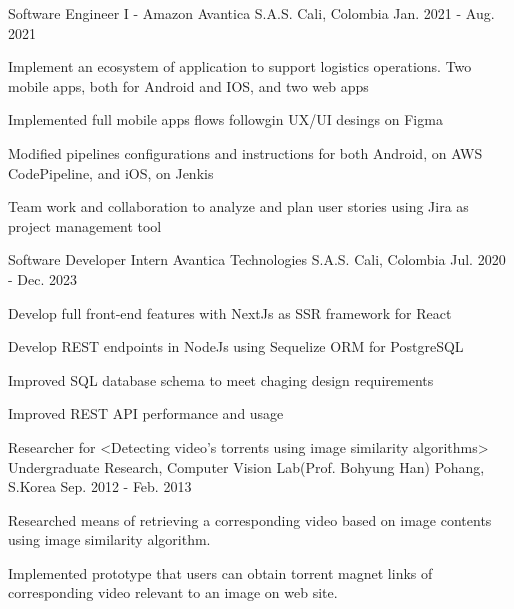 \begin{cventries}
  \cventry
  {Software Engineer I - Amazon} %
  {Avantica S.A.S.} %
  {Cali, Colombia} %
  {Jan. 2021 - Aug. 2021} %
  {
    \begin{cvitems} %
      \item {Implement an ecosystem of application to support logistics operations. Two mobile apps, both for Android and IOS, and two web apps}
      \item {Implemented full mobile apps flows followgin UX/UI desings on Figma}
      \item {Modified pipelines configurations and instructions for both Android, on AWS CodePipeline, and iOS, on Jenkis}
      \item {Team work and collaboration to analyze and plan user stories using Jira as project management tool}
    \end{cvitems}
  }

  \cventry
    {Software Developer Intern} %
    {Avantica Technologies S.A.S.} %
    {Cali, Colombia} %
    {Jul. 2020 - Dec. 2023} %
    {
      \begin{cvitems} %
        \item {Develop full front‐end features with NextJs as SSR framework for React}
        \item {Develop REST endpoints in NodeJs using Sequelize ORM for PostgreSQL}
        \item {Improved SQL database schema to meet chaging design requirements}
        \item {Improved REST API performance and usage}
      \end{cvitems}
    }

  \cventry
    {Researcher for <Detecting video’s torrents using image similarity algorithms>} %
    {Undergraduate Research, Computer Vision Lab(Prof. Bohyung Han)} %
    {Pohang, S.Korea} %
    {Sep. 2012 - Feb. 2013} %
    {
      \begin{cvitems} %
        \item {Researched means of retrieving a corresponding video based on image contents using image similarity algorithm.}
        \item {Implemented prototype that users can obtain torrent magnet links of corresponding video relevant to an image on web site.}
      \end{cvitems}
    }

\end{cventries}
